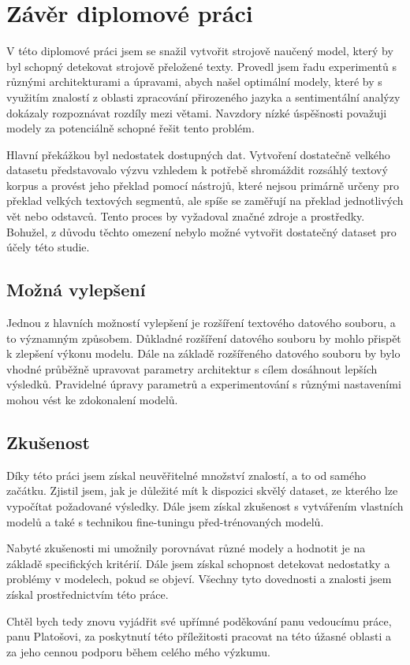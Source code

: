 \chapter{Závěr diplomové práci}
V této diplomové práci jsem se snažil vytvořit strojově naučený model, který by byl schopný detekovat strojově přeložené texty.
Provedl jsem řadu experimentů s různými architekturami a úpravami, abych našel optimální modely, které by s využitím znalostí z oblasti zpracování přirozeného jazyka a sentimentální analýzy dokázaly rozpoznávat rozdíly mezi větami.
Navzdory  nízké úspěšnosti považuji modely za potenciálně schopné řešit tento problém.

Hlavní překážkou byl nedostatek dostupných dat.
Vytvoření dostatečně velkého datasetu představovalo výzvu vzhledem k potřebě shromáždit rozsáhlý textový korpus a provést jeho překlad pomocí nástrojů, které nejsou primárně určeny pro překlad velkých textových segmentů, ale spíše se zaměřují na překlad jednotlivých vět nebo odstavců.
Tento proces by vyžadoval značné zdroje a prostředky.
Bohužel, z důvodu těchto omezení nebylo možné vytvořit dostatečný dataset pro účely této studie.

\section{Možná vylepšení}
Jednou z hlavních možností vylepšení je rozšíření textového datového souboru, a to významným způsobem.
Důkladné rozšíření datového souboru by mohlo přispět k zlepšení výkonu modelu.
Dále na základě rozšířeného datového souboru by bylo vhodné průběžně upravovat parametry architektur s cílem dosáhnout lepších výsledků.
Pravidelné úpravy parametrů a experimentování s různými nastaveními mohou vést ke zdokonalení modelů.

\section{Zkušenost}
Díky této práci jsem získal neuvěřitelné množství znalostí, a to od samého začátku.
Zjistil jsem, jak je důležité mít k dispozici skvělý dataset, ze kterého lze vypočítat požadované výsledky.
Dále jsem získal zkušenost s vytvářením vlastních modelů a také s technikou fine-tuningu před-trénovaných modelů.

Nabyté zkušenosti mi umožnily porovnávat různé modely a hodnotit je na základě specifických kritérií.
Dále jsem získal schopnost detekovat nedostatky a problémy v modelech, pokud se objeví.
Všechny tyto dovednosti a znalosti jsem získal prostřednictvím této práce.

Chtěl bych tedy znovu vyjádřit své upřímné poděkování panu vedoucímu práce, panu Platošovi, za poskytnutí této příležitosti pracovat na této úžasné oblasti a za jeho cennou podporu během celého mého výzkumu.
\endinput
